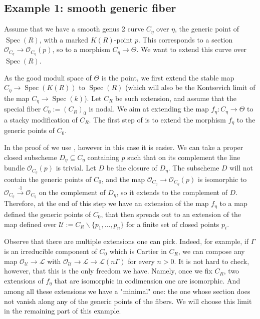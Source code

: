 \documentclass{amsart}
\newcommand{\cL}{\mathcal{L}}
\newcommand{\cO}{\mathcal{O}}
\newcommand{\cU}{\mathcal{U}}
\newcommand{\spec}{\operatorname{Spec}}
\theoremstyle{definition}
\begin{document}
\subsection{Example 1: smooth generic fiber}\label{subsection example 1}

Assume that we have a smooth genus 2 curve $C_\eta$ over $\eta$, the generic point of $\spec(R)$, with a marked $K(R)$-point $p$. This corresponds to a section $\cO_{C_\eta}\to \cO_{C_\eta}(p)$, so to a morphism $C_\eta\to \Theta$. We want to extend this curve over $\spec(R)$.

As the good moduli space of $\Theta$ is the point, we first extend the stable map $C_\eta\to \spec(K(R))$ to $\spec(R)$ (which will also be the Kontsevich limit of the map $C_\eta \to \spec(k)$). Let $C_R$ be such extension, and assume that the special fiber $C_0:= (C_R)_0$ is nodal. We aim at extending the map $f_\eta:C_\eta \to \Theta$ to a stacky modification of $C_R$. The first step of  is to extend the morphism $f_\eta$ to the generic points of $C_0$.

In the proof of  we use , however in this case it is easier. We can take a proper closed subscheme $D_\eta\subseteq C_\eta$ containing $p$ such that on its complement the line bundle $\cO_{C_\eta}(p)$ is trivial. Let $D$ be the closure of $D_\eta$. The subscheme $D$ will not contain the generic points of $C_0$, and the map $\cO_{C_\eta}\to \cO_{C_\eta}(p)$ is isomorphic to $\cO_{C_\eta}\xrightarrow{\cdot 1} \cO_{C_\eta}$ on the complement of $D_\eta$, so it extends to the complement of $D$. 
Therefore, at the end of this step we have an extension of the map $f_\eta$ to a map defined the generic points of $C_0$, that then spreads out to an extension of the map defined over $\cU:= C_R\smallsetminus \{p_1,...,p_n\}$ for a finite set of closed points $p_i$.

Observe that there are multiple extensions one can pick. Indeed, for example, if $\Gamma$ is an irreducible component of $C_0$ which is Cartier in $C_R$, we can compose any map $\cO_{\cU}\to \cL$ with $\cO_\cU\to \cL\to \cL(n\Gamma)$ for every $n>0$. It is not hard to check, however, that this is the only freedom we have. Namely, once we fix $C_R$, two extensions of $f_\eta$ that are isomorphic in codimension one are isomorphic. And among all these extensions we have a "minimal" one: the one whose section does not vanish along any of the generic points of the fibers. We will choose this limit in the remaining part of this example.
\end{document}
